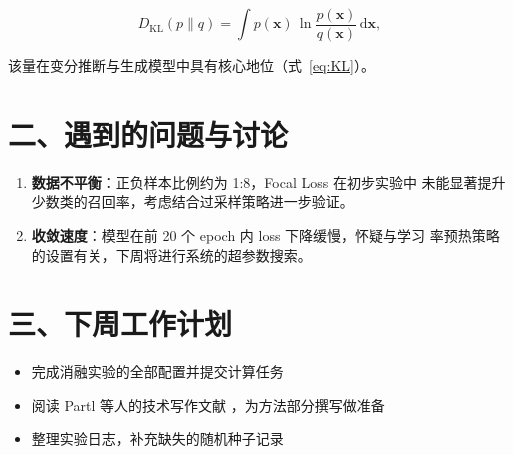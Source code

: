 \documentclass{sjtuweekly}
\begin{document}
\begin{equation}
  D_{\mathrm{KL}}(p \parallel q)
    = \int p(\boldsymbol{x}) \,
      \ln \frac{p(\boldsymbol{x})}{q(\boldsymbol{x})} \,
      \mathrm{d}\boldsymbol{x},
  \label{eq:KL}
\end{equation}

该量在变分推断与生成模型中具有核心地位（式~\ref{eq:KL}）。

\section{二、遇到的问题与讨论}

\begin{enumerate}
  \item \textbf{数据不平衡}：正负样本比例约为 1:8，Focal Loss 在初步实验中
    未能显著提升少数类的召回率，考虑结合过采样策略进一步验证。
  \item \textbf{收敛速度}：模型在前 20 个 epoch 内 loss 下降缓慢，怀疑与学习
    率预热策略的设置有关，下周将进行系统的超参数搜索。
\end{enumerate}

\section{三、下周工作计划}

\begin{itemize}
  \item 完成消融实验的全部配置并提交计算任务
  \item 阅读 Partl 等人的技术写作文献 \cite{partl2016}，为方法部分撰写做准备
  \item 整理实验日志，补充缺失的随机种子记录
\end{itemize}

\printbib
\end{document}
